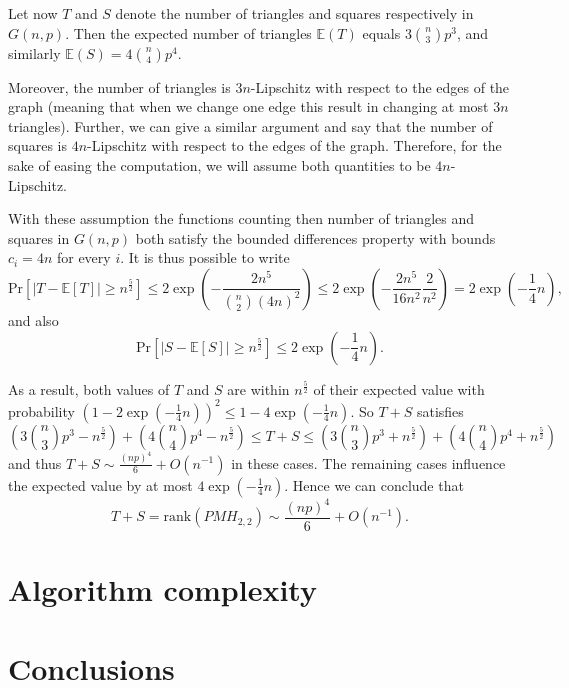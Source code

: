 \documentclass{article}
\newcommand{\E}{\mathbb{E}}
\newcommand{\Prob}{\mathrm{Pr}}
\newcommand{\rank}{\mathrm{rank}}
\begin{document}
	Let now $T$ and $S$ denote the number of triangles and squares respectively in $G(n,p)$.
	Then the expected number of triangles $\E(T)$ equals $3 \binom{n}{3}p^3$, and similarly $\E(S)=4 \binom{n}{4}p^4$.
	
	Moreover, the number of triangles is $3n$-Lipschitz with respect to the edges of the graph (meaning that when we change one edge this result in changing at most $3n$ triangles).
	Further, we can give a similar argument and say that the number of squares is $4n$-Lipschitz with respect to the edges of the graph.
	Therefore, for the sake of easing the computation, we will assume both quantities to be $4n$-Lipschitz.  
	
	With these assumption the functions counting then number of triangles and squares in $G(n,p)$ both satisfy the bounded differences property with bounds $c_i = 4n$ for every $i$.
	It is thus possible to write
	\[
	\Prob[\left|T - \E[T]\right|\geq n^{\frac{5}{2}}] \leq  2 \exp \left(-\frac{2n^5}{\binom{n}{2}(4n)^2} \right) \leq 2 \exp \left(-\frac{2n^5}{16 n^2} \frac{2}{n^2} \right) = 2 \exp \left(-\frac{1}{4}n \right),
	\]
	and also
	\[
	\Prob[\left|S - \E[S]\right|\geq n^{\frac{5}{2}}] \leq  2 \exp \left(-\frac{1}{4}n \right).
	\]
	
	As a result, both values of $T$ and $S$ are within $n^{\frac{5}{2}}$ of their expected value with probability $\left(1- 2\exp \left(-\frac{1}{4}n \right) \right)^2 \leq 1-4\exp\left(-\frac{1}{4}n\right)$.
	So $T+S$ satisfies 
	\[
	\left(3 \binom{n}{3}p^3 - n^{\frac{5}{2}}\right) + \left(4 \binom{n}{4}p^4 - n^{\frac{5}{2}}\right)
	\leq T+S \leq
	\left(3 \binom{n}{3}p^3 + n^{\frac{5}{2}}\right) + \left(4 \binom{n}{4}p^4 + n^{\frac{5}{2}}\right)
	\]
	and thus $T+S \sim \frac{(np)^4}{6} + O(n^{-1})$ in these cases.
	The remaining cases influence the expected value by at most $4\exp\left(-\frac{1}{4}n\right)$. 
	Hence we can conclude that
	\[
	T+S = \rank(PMH_{2,2}) \sim \frac{(np)^4}{6} + O(n^{-1}).
	\]
	
	
	\section{Algorithm complexity}
	
	\section{Conclusions}
	
	
	
		
\end{document}

